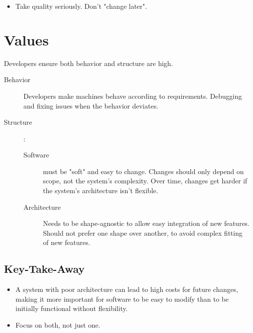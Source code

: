 \documentclass[../Main.tex]{subfiles}
\begin{document}
\begin{itemize}
    \item Take quality seriously. Don't "change later".
\end{itemize}

\section{Values}

Developers ensure both behavior and structure are high.

\begin{description}
    \item[Behavior]
        Developers make machines behave according to requirements.
        Debugging and fixing issues when the behavior deviates.
    \item [Structure]: \begin{description}
              \item [Software] must be "soft" and easy to change.
                    Changes should only depend on scope, not the system's complexity.
                    Over time, changes get harder if the system's architecture isn't flexible.
              \item [Architecture]
                    Needs to be shape-agnostic to allow easy integration of new features.
                    Should not prefer one shape over another, to avoid complex fitting of new features.
          \end{description}
\end{description}

\subsection{Key-Take-Away}
\begin{itemize}
    \item A system with poor architecture can lead to high costs for future changes,
          making it more important for software to be easy to modify than to be initially functional without flexibility.
    \item Focus on both, not just one.
\end{itemize}
\end{document}
